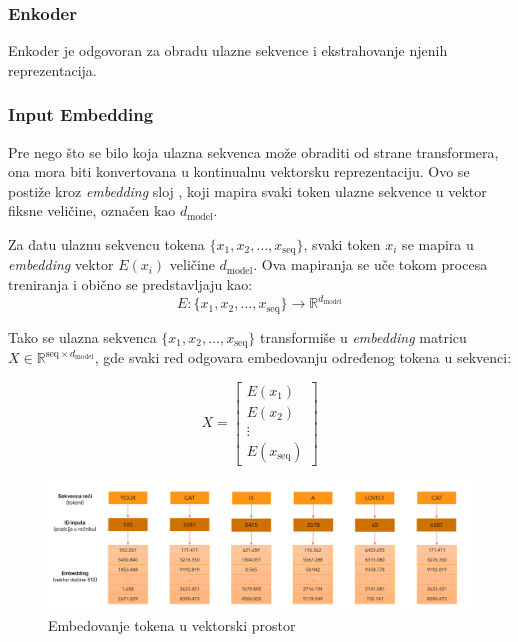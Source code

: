 \documentclass[12pt]{article}
\begin{document}
   \subsubsection{Enkoder}
   Enkoder je odgovoran za obradu ulazne sekvence i ekstrahovanje njenih reprezentacija.

   \subsubsection*{Input Embedding}

   Pre nego što se bilo koja ulazna sekvenca može obraditi od strane transformera, 
   ona mora biti konvertovana u kontinualnu vektorsku reprezentaciju. 
   Ovo se postiže kroz \textit{embedding} sloj , 
   koji mapira svaki token ulazne sekvence u vektor fiksne veličine, 
   označen kao \( d_{\text{model}} \).

   \newpage
   Za datu ulaznu sekvencu tokena \(\{x_1, x_2, \dots, x_\text{seq}\}\), 
   svaki token \(x_i\) se mapira u \textit{embedding} vektor \(E(x_i)\) 
   veličine \( d_{\text{model}} \). Ova mapiranja se uče tokom procesa treniranja 
   i obično se predstavljaju kao:
   \[
   E: \{x_1, x_2, \dots, x_\text{seq}\} \rightarrow \mathbb{R}^{d_{\text{model}}}
   \]

   Tako se ulazna sekvenca \(\{x_1, x_2, \dots, x_\text{seq}\}\) transformiše u 
   \textit{embedding} matricu \(X \in \mathbb{R}^{\text{seq} \times d_{\text{model}}}\), gde svaki 
   red odgovara embedovanju određenog tokena u sekvenci:

   \[
   X = \begin{bmatrix}
   E(x_1) \\
   E(x_2) \\
   \vdots \\
   E(x_\text{seq})
   \end{bmatrix}
   \]

   \begin{figure}[h!]
      \hspace{-2cm} %
      \includegraphics[width=1.3\textwidth]{token.png}
      \caption{Embedovanje tokena u vektorski prostor}
      \label{fig:token_embedding}
   \end{figure}
\end{document}
